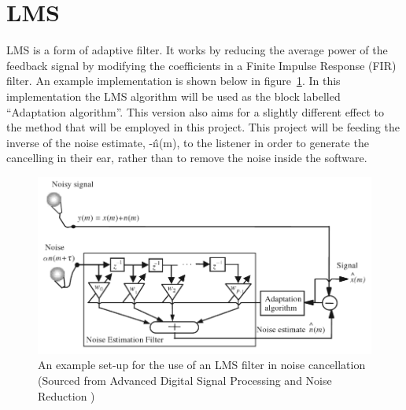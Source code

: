 \section{LMS}
\label{sec:planlms}
LMS is a form of adaptive filter.
It works by reducing the average power of the feedback signal by modifying the coefficients in a Finite Impulse Response (FIR) filter.
An example implementation is shown below in figure~\ref{fig:lmsfilter}.
In this implementation the LMS algorithm will be used as the block labelled ``Adaptation algorithm''.
This version also aims for a slightly different effect to the method that will be employed in this project.
This project will be feeding the inverse of the noise estimate, -\^{n}(m), to the listener in order to generate the cancelling in their ear, rather than to remove the noise inside the software.

\begin{figure}[H]
	\centering
	\includegraphics[width=\textwidth]{./img/lmsfilter.png}
	\caption{An example set-up for the use of an LMS filter in noise cancellation (Sourced from Advanced Digital Signal Processing and Noise Reduction \cite{AdvancedDSPing})}
	\label{fig:lmsfilter}
\end{figure}


